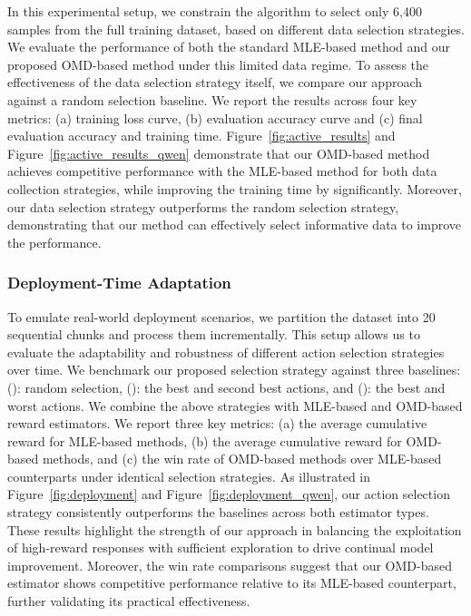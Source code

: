 In this experimental setup, we constrain the algorithm to select only 6,400 samples from the full training dataset, based on different data selection strategies. We evaluate the performance of both the standard MLE-based method and our proposed OMD-based method under this limited data regime. To assess the effectiveness of the data selection strategy itself, we compare our approach against a random selection baseline. We report the results across four key metrics: (a) training loss curve, (b) evaluation accuracy curve and (c) final evaluation accuracy and training time. Figure~\ref{fig:active_results} and Figure~\ref{fig:active_results_qwen} demonstrate that our OMD-based method achieves competitive performance with the MLE-based method for both data collection strategies, while improving the training time by significantly. Moreover, our data selection strategy outperforms the random selection strategy, demonstrating that our method can effectively select informative data to improve the performance.


\subsubsection{Deployment-Time Adaptation}

To emulate real-world deployment scenarios, we partition the dataset into 20 sequential chunks and process them incrementally. This setup allows us to evaluate the adaptability and robustness of different action selection strategies over time. We benchmark our proposed selection strategy against three baselines: (): random selection, (): the best and second best actions, and (): the best and worst actions. We combine the above strategies with MLE-based and OMD-based reward estimators. We report three key metrics: (a) the average cumulative reward for MLE-based methods, (b) the average cumulative reward for OMD-based methods, and (c) the win rate of OMD-based methods over MLE-based counterparts under identical selection strategies. As illustrated in Figure~\ref{fig:deployment} and Figure~\ref{fig:deployment_qwen}, our action selection strategy consistently outperforms the baselines across both estimator types. These results highlight the strength of our approach in balancing the exploitation of high-reward responses with sufficient exploration to drive continual model improvement. Moreover, the win rate comparisons suggest that our OMD-based estimator shows competitive performance relative to its MLE-based counterpart, further validating its practical effectiveness.

